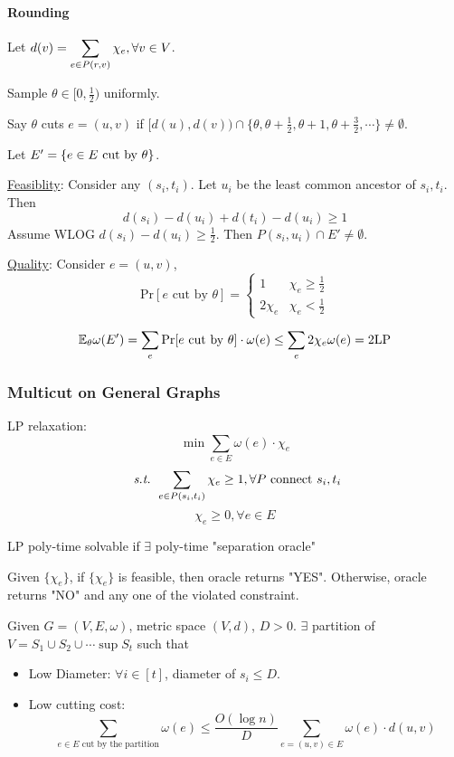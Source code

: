 \paragraph{Rounding} Let  $ d(v)=\displaystyle\sum_{e\in P(r,v)}\chi_e,\forall v\in V $.

Sample  $ \theta\in [0,\frac{1}{2}) $ uniformly.

Say  $ \theta $ cuts  $ e=(u,v)  $ if  $ [d(u),d(v))\cap\{\theta,\theta+\frac{1}{2},\theta+1,\theta+\frac{3}{2},\cdots\}\neq \emptyset $.

Let   $ E'=\{e\in E\text{ cut by  $ \theta $}\} $.

\underline{Feasiblity}: Consider any  $ (s_i,t_i) $. Let  $ u_i $ be the least common ancestor of  $ s_i,t_i $.  Then 
\[d(s_i)-d(u_i)+d(t_i)-d(u_i) \geq 1\]
Assume WLOG  $ d(s_i)-d(u_i) \geq \frac{1}{2} $. Then  $ P(s_i,u_i)\cap E'\neq \emptyset $.

\underline{Quality}: Consider  $ e=(u,v) $,
\[\mathrm{Pr}[e\text{ cut by }\theta]=\begin{cases}
    1&\chi_e \geq \frac{1}{2}\\
    2\chi_e&\chi_e<\frac{1}{2}
\end{cases}\]

\[\mathbb E_\theta \omega(E')=\sum_e\mathrm{Pr}[e\text{ cut by }\theta]\cdot \omega(e) \leq \sum_e2\chi_e\omega(e)=2\mathrm{LP}\]


\subsubsection{Multicut on General Graphs}
LP relaxation:
\[\min \sum_{e\in E }\omega(e)\cdot\chi_e\]
\[\textit{ s.t. } \sum_{e\in P(s_i,t_i)}\chi_e \geq 1,\forall P \text{ connect }s_i,t_i\]
\[\chi_e \geq 0,\forall e\in E\]
\begin{theorem}
    LP poly-time solvable if  $ \exists  $ poly-time "separation oracle"
\end{theorem}
\begin{definition}
    Given  $ \{\chi_e\} $, if  $ \{\chi_e\} $ is feasible, then oracle returns "YES". Otherwise, oracle returns "NO" and any one of the violated constraint. 
\end{definition}

\begin{theorem}\label{thm:LDD} 
    Given  $ G=(V,E,\omega) $, metric space  $ (V,d) $,  $ D>0 $.  $ \exists  $ partition of  $ V=S_1\cup S_2\cup\cdots\sup S_t $ such that     
    \begin{itemize}
        \item Low Diameter:  $ \forall i\in [t] $, diameter of  $ s_i \leq D $.
        \item Low cutting cost:
        \[\sum_{e\in E\text{ cut by the partition}}\omega(e) \leq \frac{O(\log n)}{D}\sum_{e=(u,v)\in E}\omega(e)\cdot d(u,v)\]
    \end{itemize}
\end{theorem}


